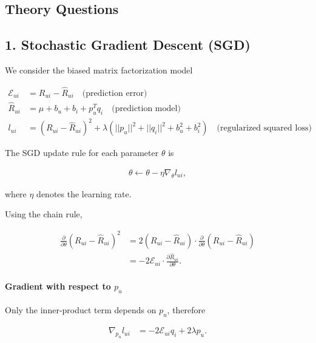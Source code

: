 \documentclass[11pt]{article}
\begin{document}
\begin{appendices}
\section{Theory Questions}
\label{app:theory}

\subsection*{1. Stochastic Gradient Descent (SGD)}

\noindent We consider the biased matrix factorization model

\begin{align*}
    \mathcal{E}_{ui} &= R_{ui} - \hat{R}_{ui}
    \quad \text{(prediction error)} \\
    \hat{R}_{ui} &= \mu + b_u + b_i + p_u^T q_i
    \quad \text{(prediction model)} \\
    l_{ui} &= (R_{ui} - \hat{R}_{ui})^2
    + \lambda (||p_u||^2 + ||q_i||^2 + b_u^2 + b_i^2)
    \quad \text{(regularized squared loss)}
\end{align*}

\noindent The SGD update rule for each parameter $\theta$ is

\begin{align*}
    \theta \leftarrow \theta - \eta \nabla_{\theta}l_{ui},
\end{align*}

\noindent where $\eta$ denotes the learning rate.

\noindent Using the chain rule,

\begin{align*}
    \frac{\partial}{\partial\theta}(R_{ui} - \hat{R}_{ui})^2
    &= 2(R_{ui} - \hat{R}_{ui})
    \cdot
    \frac{\partial}{\partial\theta}(R_{ui} - \hat{R}_{ui}) \\
    &= -2 \mathcal{E}_{ui}
    \cdot
    \frac{\partial\hat{R}_{ui}}{\partial\theta}.
\end{align*}

\paragraph{Gradient with respect to $p_u$}

\noindent Only the inner-product term depends on $p_u$, therefore

\begin{align*}
    \nabla_{p_u} l_{ui}
    &= -2\mathcal{E}_{ui} q_i + 2\lambda p_u.
\end{align*}


\end{appendices}
\end{document}
